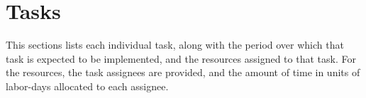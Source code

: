 \section{Tasks}

This sections lists each individual task, along with the period over which that task is expected to be implemented, and the resources assigned to that task. For the resources, the task assignees are provided, and the amount of time in units of labor-days allocated to each assignee.


